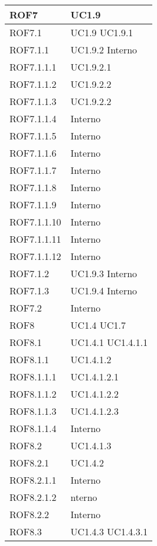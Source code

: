 \begin{center}
\begin{longtable}{| p{4cm} | p{4cm} |}
\hline
ROF7   &  UC1.9 \\
\hline
ROF7.1   &  UC1.9 \newline UC1.9.1 \\
\hline
ROF7.1.1   &  UC1.9.2 \newline Interno \\
\hline
ROF7.1.1.1   &  UC1.9.2.1 \\
\hline
ROF7.1.1.2   &  UC1.9.2.2 \\
\hline
ROF7.1.1.3   &  UC1.9.2.2 \\
\hline
ROF7.1.1.4   &  Interno \\
\hline
ROF7.1.1.5   &  Interno \\
\hline
ROF7.1.1.6   &  Interno \\
\hline
ROF7.1.1.7   &  Interno \\
\hline
ROF7.1.1.8   &  Interno \\
\hline
ROF7.1.1.9   &  Interno \\
\hline
ROF7.1.1.10   &  Interno \\
\hline
ROF7.1.1.11   &  Interno \\
\hline
ROF7.1.1.12   &  Interno \\
\hline
ROF7.1.2   &  UC1.9.3 \newline Interno \\
\hline
ROF7.1.3   &  UC1.9.4 \newline Interno \\
\hline
ROF7.2   &  Interno \\
\hline
ROF8   &  UC1.4 \newline UC1.7 \\
\hline
ROF8.1   &  UC1.4.1 \newline UC1.4.1.1 \\
\hline
ROF8.1.1   &  UC1.4.1.2 \\
\hline
ROF8.1.1.1   &  UC1.4.1.2.1 \\
\hline
ROF8.1.1.2   &  UC1.4.1.2.2 \\
\hline
ROF8.1.1.3   &  UC1.4.1.2.3 \\
\hline
ROF8.1.1.4   &  Interno \\
\hline
ROF8.2   &  UC1.4.1.3 \\
\hline
ROF8.2.1   &  UC1.4.2 \\
\hline
ROF8.2.1.1   &  Interno \\
\hline
ROF8.2.1.2   &  nterno \\
\hline
ROF8.2.2   &  Interno \\
\hline
ROF8.3   &  UC1.4.3 \newline UC1.4.3.1  \\

\end{longtable}
\end{center}
